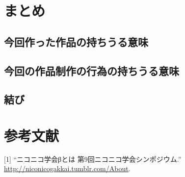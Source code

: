 \chapter{まとめ}\label{ux307eux3068ux3081}

\section{今回作った作品の持ちうる意味}\label{ux4ecaux56deux4f5cux3063ux305fux4f5cux54c1ux306eux6301ux3061ux3046ux308bux610fux5473}

\section{今回の作品制作の行為の持ちうる意味}\label{ux4ecaux56deux306eux4f5cux54c1ux5236ux4f5cux306eux884cux70baux306eux6301ux3061ux3046ux308bux610fux5473}

\section{結び}\label{ux7d50ux3073}

\chapter*{参考文献}\label{ux53c2ux8003ux6587ux732e}

\hypertarget{refs}{}
\hypertarget{ref-niconicogakkai}{}
{[}1{]} ``ニコニコ学会βとは 第9回ニコニコ学会シンポジウム.''
\url{http://niconicogakkai.tumblr.com/About}.
